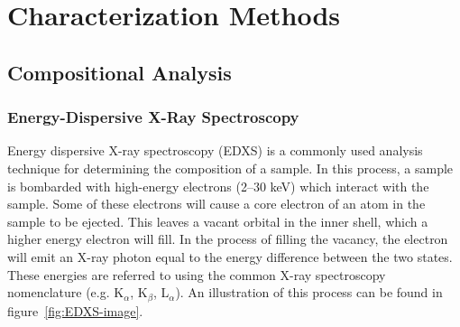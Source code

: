 \chapter{Characterization Methods}
\label{ch:characterization}
\thispagestyle{empty}

%
%
%
%
%
%
%
%
%
%
%

\section{Compositional Analysis}


\subsection{Energy-Dispersive X-Ray Spectroscopy}

Energy dispersive X-ray spectroscopy (EDXS) is a commonly used analysis technique for determining the composition of a sample. In this process, a sample is bombarded with high-energy electrons (2--30 keV) which interact with the sample. Some of these electrons will cause a core electron of an atom in the sample to be ejected. This leaves a vacant orbital in the inner shell, which a higher energy electron will fill. In the process of filling the vacancy, the electron will emit an X-ray photon equal to the energy difference between the two states. These energies are referred to using the common X-ray spectroscopy nomenclature (e.g. K$_{\alpha}$, K$_{\beta}$, L$_{\alpha}$). An illustration of this process can be found in figure~\vref{fig:EDXS-image}.  


